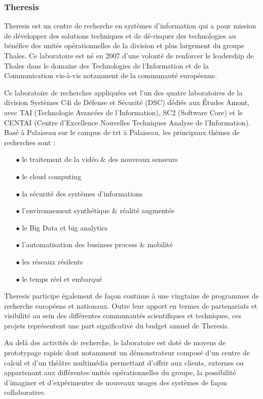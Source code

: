 \subsubsection{Theresis}
Theresis est un centre de recherche en systèmes d'information qui a pour mission de développer des solutions techniques et de dé-risquer des technologies au bénéfice des unités opérationnelles de la division et plus largement du groupe Thales. Ce laboratoire est né en 2007 d'une volonté de renforcer le leadership de Thales dans le domaine des Technologies de l'Information et de la Communication vis-à-vis notamment de la communauté européenne.

Ce laboratoire de recherches appliquées est l’un des quatre laboratoires de la division Systèmes C4i de Défense et Sécurité (DSC) dédiés aux Études Amont, avec TAI (Technologie Avancées de l’Information), SC2 (Software Core) et le CENTAI (Centre d’Excellence Nouvelles Techniques Analyse de l’Information)\cite{ThalesSIX:2016}. 
Basé à Palaiseau sur le campus de \gls{trt} à Palaiseau, les principaux thèmes de recherches sont :
\begin{itemize}
\item[$\bullet$] le traitement de la vidéo \& des nouveaux senseurs
\item[$\bullet$] le cloud computing
\item[$\bullet$] la sécurité des systèmes d'informations
\item[$\bullet$] l'environnement synthétique \& réalité augmentée
\item[$\bullet$] le Big Data et big analytics
\item[$\bullet$] l'automatisation des business process \& mobilité
\item[$\bullet$] les réseaux résilents
\item[$\bullet$] le temps réel et embarqué
\end{itemize}

Theresis participe également de façon continue à une vingtaine de programmes de recherche européens et nationaux. Outre leur apport en termes de partenariats et visibilité au sein des différentes communautés scientifiques et techniques, ces projets représentent une part significative du budget annuel de Theresis.

Au delà des activités de recherche, le laboratoire est doté de moyens de prototypage rapide dont notamment un démonstrateur composé d'un centre de calcul et d'un théâtre multimédia permettant d'offrir aux clients, externes ou appartenant aux différentes unités opérationnelles du groupe, la possibilité d'imaginer et d'expérimenter de nouveaux usages des systèmes de façon collaborative. \\

